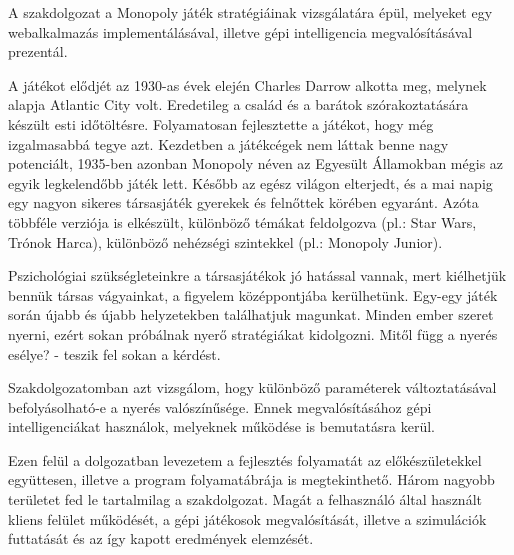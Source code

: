 
A szakdolgozat a Monopoly játék stratégiáinak vizsgálatára épül, melyeket egy webalkalmazás implementálásával, illetve gépi intelligencia megvalósításával prezentál.

	A játékot elődjét az 1930-as évek elején Charles Darrow alkotta meg, melynek alapja Atlantic City volt. Eredetileg a család és a barátok szórakoztatására készült esti időtöltésre. Folyamatosan fejlesztette a játékot, hogy még izgalmasabbá tegye azt. Kezdetben a játékcégek nem láttak benne nagy potenciált, 1935-ben azonban Monopoly néven az Egyesült Államokban mégis az egyik legkelendőbb játék lett. Később az egész világon elterjedt, és a mai napig egy nagyon sikeres társasjáték gyerekek és felnőttek körében egyaránt. Azóta többféle verziója is elkészült, különböző témákat feldolgozva (pl.: Star Wars, Trónok Harca), különböző nehézségi szintekkel (pl.: Monopoly Junior).

	Pszichológiai szükségleteinkre a társasjátékok jó hatással vannak, mert kiélhetjük bennük társas vágyainkat, a figyelem középpontjába kerülhetünk. Egy-egy játék során újabb és újabb helyzetekben találhatjuk magunkat. Minden ember szeret nyerni, ezért sokan próbálnak nyerő stratégiákat kidolgozni. Mitől függ a nyerés esélye? - teszik fel sokan a kérdést.

	Szakdolgozatomban azt vizsgálom, hogy különböző paraméterek változtatásával befolyásolható-e a nyerés valószínűsége. Ennek megvalósításához gépi intelligenciákat használok, melyeknek működése is bemutatásra kerül.

Ezen felül a dolgozatban levezetem a fejlesztés folyamatát az előkészületekkel együttesen, illetve a program folyamatábrája is megtekinthető. Három nagyobb területet fed le tartalmilag a szakdolgozat. Magát a felhasználó által használt kliens felület működését, a gépi játékosok megvalósítását, illetve a szimulációk futtatását és az így kapott eredmények elemzését.
